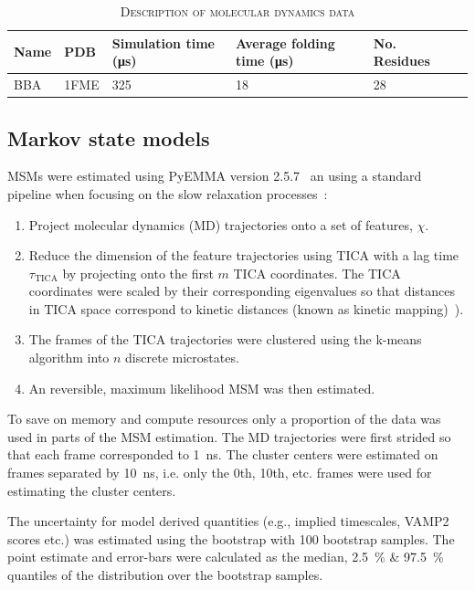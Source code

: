 \documentclass[journal=jacsat,manuscript=article]{achemso}
\begin{document}
\begin{table}
    \caption{\textsc{Description of molecular dynamics data}}
    \begin{tabularx}{\textwidth}{llXXXX}
    \toprule
    Name & PDB & Simulation time (\si{\micro\second}) & Average folding time (\si{\micro\second}) & No. Residues & \\
    \midrule
    BBA                 & 1FME      & \num{325}     & \num{18}  & 28 & \\
    \bottomrule
    \end{tabularx}
    \label{tab:data_description}
\end{table}

\subsection{Markov state models}
MSMs were estimated using PyEMMA version 2.5.7~\cite{schererPyEMMASoftwarePackage2015a} an using a standard pipeline when focusing on the slow relaxation processes~\cite{noe_markov_2019, husic_markov_2018}: 
\begin{enumerate}
    \item Project molecular dynamics (MD) trajectories onto a set of features, $\chi$. 
    \item Reduce the dimension of the feature trajectories using TICA with a lag time $\tau_{\mathrm{TICA}}$ by projecting onto the first $m$ TICA coordinates. The TICA coordinates were scaled by their corresponding eigenvalues so that distances in  TICA space correspond to kinetic distances (known as kinetic mapping)~\cite{noeKineticDistanceKinetic2015}).
    \item The frames of the TICA trajectories were clustered using the k-means algorithm into $n$ discrete microstates. 
    \item An reversible, maximum likelihood MSM was then estimated. 
\end{enumerate}
To save on memory and compute resources only a proportion of the data was used in parts of the MSM estimation. The MD trajectories were first strided so that each frame corresponded to \SI{1}{\nano\second}. The cluster centers were estimated on frames separated by \SI{10}{\nano\second}, i.e. only the 0th, 10th, etc. frames were used for estimating the cluster centers. 

The uncertainty for model derived quantities (e.g., implied timescales, VAMP2 scores etc.) was estimated using the bootstrap with \num{100} bootstrap samples. The point estimate and error-bars  were calculated as the median,   \SI{2.5}{\percent} \& \SI{97.5}{\percent} quantiles of the distribution over the bootstrap samples.
\end{document}
